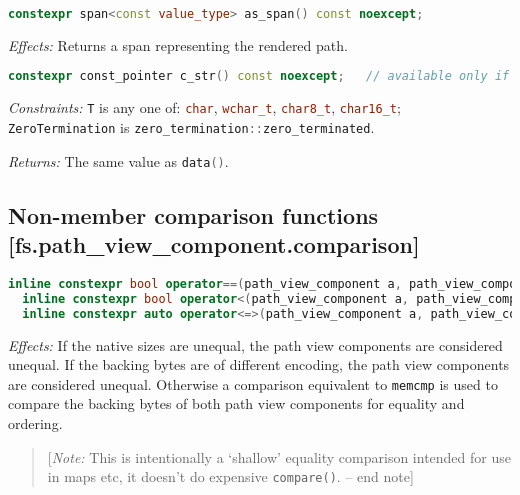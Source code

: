 \documentclass[11pt]{article}
\newcommand{\code}[2][cpp]{\lstinline[language=#1,basicstyle=\small\ttfamily]{#2}}
\newcommand{\desc}[1]{\textit{#1}}
\newcommand{\constraints}{\desc{Constraints: }}
\newcommand{\effects}{\desc{Effects: }}
\newcommand{\returns}{\desc{Returns: }}
\newcommand{\note}[1]{\begin{quote}[\textit{Note:} #1 -- end note]\end{quote}}
\begin{document}
\begin{lstlisting}[language=cpp]
    constexpr span<const value_type> as_span() const noexcept;
\end{lstlisting}

\effects Returns a span representing the rendered path.\\


\begin{lstlisting}[language=cpp]
    constexpr const_pointer c_str() const noexcept;   // available only if zero_terminated and non-byte backing
\end{lstlisting}

\constraints \code{T} is any one of: \code{char}, \code{wchar_t}, \code{char8_t}, \code{char16_t}; \code{ZeroTermination} is \code{zero_termination::zero_terminated}.

\returns The same value as \code{data()}.\\

\subsection*{Non-member comparison functions [fs.path\_view\_component.comparison]}

\begin{lstlisting}[language=cpp]
  inline constexpr bool operator==(path_view_component a, path_view_component b) noexcept;
  inline constexpr bool operator<(path_view_component a, path_view_component b) noexcept;
  inline constexpr auto operator<=>(path_view_component a, path_view_component b) = default;
\end{lstlisting}

\effects If the native sizes are unequal, the path view components are considered unequal. If the backing bytes are of different encoding, the path view components are considered unequal. Otherwise a comparison equivalent to \code{memcmp} is used to compare the backing bytes of both path view components for equality and ordering.
\color{black}

\note{This is intentionally a `shallow' equality comparison intended for use in maps etc, it doesn't do expensive \code{compare()}.}

\color{darkgreen}
\end{document}
